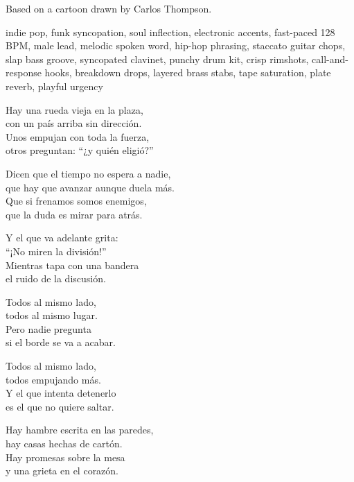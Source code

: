 

\begin{notes}
Based on a cartoon drawn by Carlos Thompson.
\end{notes}

\begin{style}
indie pop, funk syncopation, soul inflection, electronic accents, fast-paced 128 BPM, male lead, melodic spoken word, hip-hop phrasing, staccato guitar chops, slap bass groove, syncopated clavinet, punchy drum kit, crisp rimshots, call-and-response hooks, breakdown drops, layered brass stabs, tape saturation, plate reverb, playful urgency
\end{style}

\begin{lyrics}
Hay una rueda vieja en la plaza,\\
con un país arriba sin dirección.\\
Unos empujan con toda la fuerza,\\
otros preguntan: “¿y quién eligió?”

Dicen que el tiempo no espera a nadie,\\
que hay que avanzar aunque duela más.\\
Que si frenamos somos enemigos,\\
que la duda es mirar para atrás.

Y el que va adelante grita:\\
“¡No miren la división!”\\
Mientras tapa con una bandera\\
el ruido de la discusión.

Todos al mismo lado,\\
todos al mismo lugar.\\
Pero nadie pregunta\\
si el borde se va a acabar.

Todos al mismo lado,\\
todos empujando más.\\
Y el que intenta detenerlo\\
es el que no quiere saltar.

Hay hambre escrita en las paredes,\\
hay casas hechas de cartón.\\
Hay promesas sobre la mesa\\
y una grieta en el corazón.


\end{lyrics}
